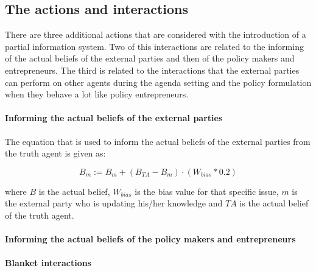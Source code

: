\documentclass[11pt]{article}
\begin{document}


\subsection{The actions and interactions}


There are three additional actions that are considered with the introduction of a partial information system. Two of this interactions are related to the informing of the actual beliefs of the external parties and then of the policy makers and entrepreneurs. The third is related to the interactions that the external parties can perform on other agents during the agenda setting and the policy formulation when they behave a lot like policy entrepreneurs.

\paragraph{Informing the actual beliefs of the external parties}

The equation that is used to inform the actual beliefs of the external parties from the truth agent is given as:

\begin{equation}
B_{m} := B_{m} + (B_{TA} - B_{m}) \cdot (W_{bias} * 0.2)
\end{equation}

where $B$ is the actual belief, $W_{bias}$ is the bias value for that specific issue, $m$ is the external party who is updating his/her knowledge and $TA$ is the actual belief of the truth agent.


\paragraph{Informing the actual beliefs of the policy makers and entrepreneurs}


\paragraph{Blanket interactions}




\appendix


 

\end{document}
